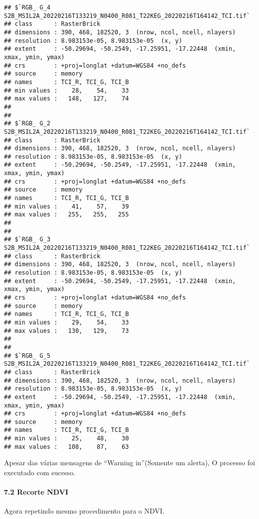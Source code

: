 \documentclass[
]{article}
\begin{document}
\begin{verbatim}
## $`RGB_ G_4 S2B_MSIL2A_20220216T133219_N0400_R081_T22KEG_20220216T164142_TCI.tif`
## class      : RasterBrick 
## dimensions : 390, 468, 182520, 3  (nrow, ncol, ncell, nlayers)
## resolution : 8.983153e-05, 8.983153e-05  (x, y)
## extent     : -50.29694, -50.2549, -17.25951, -17.22448  (xmin, xmax, ymin, ymax)
## crs        : +proj=longlat +datum=WGS84 +no_defs 
## source     : memory
## names      : TCI_R, TCI_G, TCI_B 
## min values :    28,    54,    33 
## max values :   148,   127,    74 
## 
## 
## $`RGB_ G_2 S2B_MSIL2A_20220216T133219_N0400_R081_T22KEG_20220216T164142_TCI.tif`
## class      : RasterBrick 
## dimensions : 390, 468, 182520, 3  (nrow, ncol, ncell, nlayers)
## resolution : 8.983153e-05, 8.983153e-05  (x, y)
## extent     : -50.29694, -50.2549, -17.25951, -17.22448  (xmin, xmax, ymin, ymax)
## crs        : +proj=longlat +datum=WGS84 +no_defs 
## source     : memory
## names      : TCI_R, TCI_G, TCI_B 
## min values :    41,    57,    39 
## max values :   255,   255,   255 
## 
## 
## $`RGB_ G_3 S2B_MSIL2A_20220216T133219_N0400_R081_T22KEG_20220216T164142_TCI.tif`
## class      : RasterBrick 
## dimensions : 390, 468, 182520, 3  (nrow, ncol, ncell, nlayers)
## resolution : 8.983153e-05, 8.983153e-05  (x, y)
## extent     : -50.29694, -50.2549, -17.25951, -17.22448  (xmin, xmax, ymin, ymax)
## crs        : +proj=longlat +datum=WGS84 +no_defs 
## source     : memory
## names      : TCI_R, TCI_G, TCI_B 
## min values :    29,    54,    33 
## max values :   130,   129,    73 
## 
## 
## $`RGB_ G_5 S2B_MSIL2A_20220216T133219_N0400_R081_T22KEG_20220216T164142_TCI.tif`
## class      : RasterBrick 
## dimensions : 390, 468, 182520, 3  (nrow, ncol, ncell, nlayers)
## resolution : 8.983153e-05, 8.983153e-05  (x, y)
## extent     : -50.29694, -50.2549, -17.25951, -17.22448  (xmin, xmax, ymin, ymax)
## crs        : +proj=longlat +datum=WGS84 +no_defs 
## source     : memory
## names      : TCI_R, TCI_G, TCI_B 
## min values :    25,    48,    30 
## max values :   108,    87,    63
\end{verbatim}

Apesar das várias mensagens de ``Warning in''(Somente um alerta), O
processo foi executado com sucesso.

\hypertarget{recorte-ndvi}{%
\paragraph{7.2 Recorte NDVI}\label{recorte-ndvi}}

Agora repetindo mesmo procedimento para o NDVI.
\end{document}
